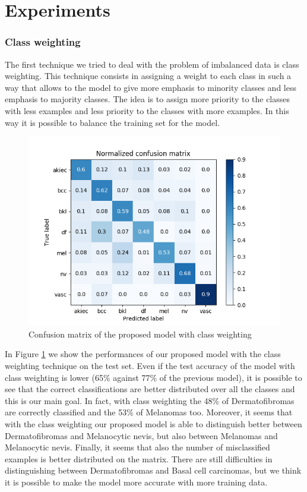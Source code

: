 \section{Experiments} \label{experiments}
		
	\subsubsection{Class weighting}
	
		The first technique we tried to deal with the problem of imbalanced data is class weighting. This technique consists in assigning a weight to each class in such a way that allows to the model to give more emphasis to minority classes and less emphasis to majority classes. The idea is to assign more priority to the classes with less examples and less priority to the classes with more examples. In this way it is possible to balance the training set for the model. 
		
		\begin{figure}[H]
			\centering
			\includegraphics[width=15cm]{images/secondMatrix.png}
			\caption{Confusion matrix of the proposed model with class weighting}
			\label{fig:second-matrix}
		\end{figure}
		
		In Figure \ref{fig:second-matrix} we show the performances of our proposed model with the class weighting technique on the test set.
		Even if the test accuracy of the model with class weighting is lower (65\% against 77\% of the previous model), it is possible to see that the correct classifications are better distributed over all the classes and this is our main goal. In fact, with class weighting the 48\% of Dermatofibromas are correctly classified and the 53\% of Melanomas too. Moreover, it seems that with the class weighting our proposed model is able to distinguish better between Dermatofibromas and Melanocytic nevis, but also between Melanomas and Melanocytic nevis. Finally, it seems that also the number of misclassified examples is better distributed on the matrix. There are still difficulties in distinguishing between Dermatofibromas and Basal cell carcinomas, but we think it is possible to make the model more accurate with more training data.
		
